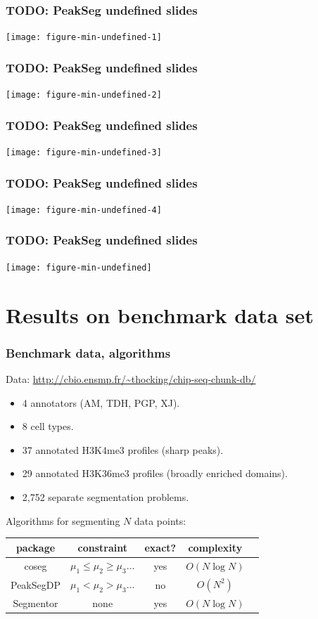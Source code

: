 \documentclass{beamer}
\begin{document}
\begin{frame}
  \frametitle{TODO: PeakSeg undefined slides}
  \texttt{[image: figure-min-undefined-1]}
\end{frame}

\begin{frame}
  \frametitle{TODO: PeakSeg undefined slides}
  \texttt{[image: figure-min-undefined-2]}
\end{frame}

\begin{frame}
  \frametitle{TODO: PeakSeg undefined slides}
  \texttt{[image: figure-min-undefined-3]}
\end{frame}

\begin{frame}
  \frametitle{TODO: PeakSeg undefined slides}
  \texttt{[image: figure-min-undefined-4]}
\end{frame}

\begin{frame}
  \frametitle{TODO: PeakSeg undefined slides}
  \texttt{[image: figure-min-undefined]}
\end{frame}

\section{Results on benchmark data set}

\begin{frame}
  \frametitle{Benchmark data, algorithms}

  Data: \url{http://cbio.ensmp.fr/~thocking/chip-seq-chunk-db/}
  \begin{itemize}
  \item 4 annotators (AM, TDH, PGP, XJ).
  \item 8 cell types.
  \item 37 annotated H3K4me3 profiles (sharp peaks).
  \item 29 annotated H3K36me3 profiles (broadly enriched domains).
  \item 2,752 separate segmentation problems.
  \end{itemize}

  Algorithms for segmenting $N$ data points:
  \begin{center}
  \begin{tabular}{ccccc}
    package & constraint & exact? & complexity \\
    \hline
    coseg & $\mu_1 \leq \mu_2 \geq \mu_3 \dots$ & yes & $O(N\log N)$ \\
    PeakSegDP & $\mu_1 < \mu_2 > \mu_3 \dots$ & no & $O(N^2)$\\
    Segmentor & none & yes & $O(N\log N)$
  \end{tabular}
  \end{center}
\end{frame}
\end{document}

